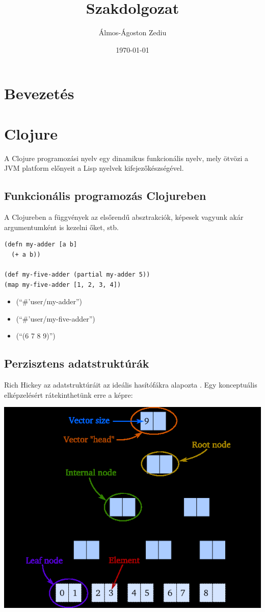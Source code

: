 \documentclass[final, 12pt] {ubb_dolgozat}
\author{Álmos-Ágoston Zediu}
\date{\today}
\title{Szakdolgozat}
\begin{document}
\maketitle
\tableofcontents


\chapter{Bevezetés}
\label{sec:org5136892}
\chapter{Clojure}
\label{sec:org8c47bb4}
A Clojure programozási nyelv egy dinamikus funkcionális nyelv, mely ötvözi a JVM platform előnyeit a Lisp nyelvek
kifejezőkészségével.
\section{Funkcionális programozás Clojureben}
\label{sec:org15d5cf3}

A Clojureben a függvények az elsőrendű absztrakciók, képesek vagyunk akár argumentumként is kezelni őket, stb.

\begin{verbatim}
(defn my-adder [a b]
  (+ a b))

(def my-five-adder (partial my-adder 5))
(map my-five-adder [1, 2, 3, 4])
\end{verbatim}

\begin{itemize}
\item (``\#'user/my-adder'')
\item (``\#'user/my-five-adder'')
\item (``(6 7 8 9)'')
\end{itemize}

\section{Perzisztens adatstruktúrák}
\label{sec:org164b5cb}
Rich Hickey az adatstruktúráit az ideális hasítófákra alapozta \citep{bagwellIdealHashTrees2001}. Egy konceptuális elképzelésért
rátekinthetünk erre a képre:

\begin{center}
\includegraphics[width=.9\linewidth]{images/perzisztens-vektor.jpg}
\end{center}
\end{document}
